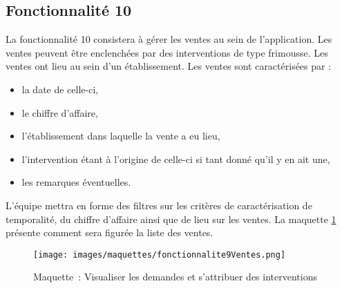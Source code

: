 \subsection{Fonctionnalité 10}

La fonctionnalité 10 consistera à gérer les ventes au sein de l'application.
Les ventes peuvent être enclenchées par des interventions de type frimousse. 
Les ventes ont lieu au sein d'un établissement.
Les ventes sont caractérisées par : 
\begin{itemize}
\item la date de celle-ci,
\item le chiffre d’affaire,
\item l’établissement dans laquelle la vente a eu lieu,
\item l’intervention étant à l’origine de celle-ci si tant donné qu’il y en ait une,
\item les remarques éventuelles.
\end{itemize}

L'équipe \PIC{} mettra en forme des filtres sur les critères de caractérisation de temporalité, du chiffre d'affaire ainsi que de lieu sur les ventes.
La maquette \ref{fonctionnalite9Ventes} présente comment sera figurée la liste des ventes.
 \\

\begin{figure}[H]
	\centering
	\texttt{[image: images/maquettes/fonctionnalite9Ventes.png]}
	 \caption{Maquette~: Visualiser les demandes et s'attribuer des interventions}
	 \label{fonctionnalite9Ventes}
\end{figure}
